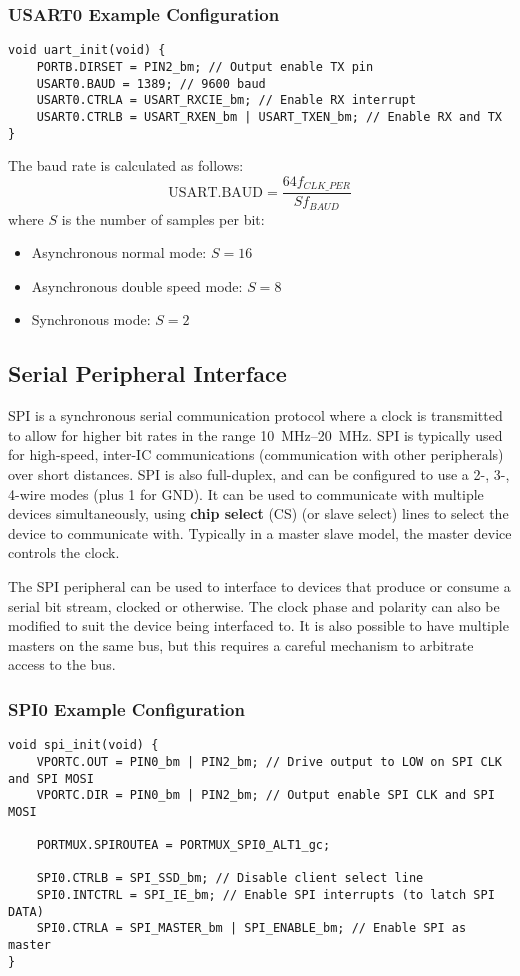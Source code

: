 \documentclass[a4paper]{report}
\begin{document}
\subsubsection{USART0 Example Configuration}
\begin{verbatim}
void uart_init(void) {
    PORTB.DIRSET = PIN2_bm; // Output enable TX pin
    USART0.BAUD = 1389; // 9600 baud
    USART0.CTRLA = USART_RXCIE_bm; // Enable RX interrupt
    USART0.CTRLB = USART_RXEN_bm | USART_TXEN_bm; // Enable RX and TX
}
\end{verbatim}
The baud rate is calculated as follows:
\begin{equation*}
    \text{USART.BAUD} = \frac{64 f_{CLK\_PER}}{S f_{BAUD}}
\end{equation*}
where \(S\) is the number of samples per bit:
\begin{itemize}
    \item Asynchronous normal mode: \(S = 16\)
    \item Asynchronous double speed mode: \(S = 8\)
    \item Synchronous mode: \(S = 2\)
\end{itemize}
\subsection{Serial Peripheral Interface}
SPI is a synchronous serial communication protocol where a clock is
transmitted to allow for higher bit rates in the range
\qtyrange{10}{20}{MHz}. SPI is typically used for high-speed, inter-IC
communications (communication with other peripherals) over short
distances. SPI is also full-duplex, and can be configured to use a 2-,
3-, 4-wire modes (plus 1 for GND). It can be used to communicate with
multiple devices simultaneously, using \textbf{chip select} (CS) (or
slave select) lines to select the device to communicate with. Typically
in a master slave model, the master device controls the clock.

The SPI peripheral can be used to interface to devices that produce or
consume a serial bit stream, clocked or otherwise. The clock phase and
polarity can also be modified to suit the device being interfaced to.
It is also possible to have multiple masters on the same bus, but this
requires a careful mechanism to arbitrate access to the bus.
\subsubsection{SPI0 Example Configuration}
\begin{verbatim}
void spi_init(void) {
    VPORTC.OUT = PIN0_bm | PIN2_bm; // Drive output to LOW on SPI CLK and SPI MOSI
    VPORTC.DIR = PIN0_bm | PIN2_bm; // Output enable SPI CLK and SPI MOSI

    PORTMUX.SPIROUTEA = PORTMUX_SPI0_ALT1_gc;

    SPI0.CTRLB = SPI_SSD_bm; // Disable client select line
    SPI0.INTCTRL = SPI_IE_bm; // Enable SPI interrupts (to latch SPI DATA)
    SPI0.CTRLA = SPI_MASTER_bm | SPI_ENABLE_bm; // Enable SPI as master
}
\end{verbatim}
\end{document}
